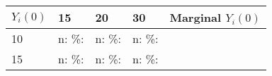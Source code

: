 \documentclass[]{article}
\begin{document}
\begin{longtable}[]{@{}lllll@{}}
\toprule
\begin{minipage}[b]{0.19\columnwidth}\raggedright\strut
\(Y_{i}(0)\)\strut
\end{minipage} & \begin{minipage}[b]{0.06\columnwidth}\raggedright\strut
15\strut
\end{minipage} & \begin{minipage}[b]{0.06\columnwidth}\raggedright\strut
20\strut
\end{minipage} & \begin{minipage}[b]{0.06\columnwidth}\raggedright\strut
30\strut
\end{minipage} & \begin{minipage}[b]{0.32\columnwidth}\raggedright\strut
Marginal \(Y_{i}(0)\)\strut
\end{minipage}\tabularnewline
\midrule
\endhead
\begin{minipage}[t]{0.19\columnwidth}\raggedright\strut
10\strut
\end{minipage} & \begin{minipage}[t]{0.06\columnwidth}\raggedright\strut
n: \%:\strut
\end{minipage} & \begin{minipage}[t]{0.06\columnwidth}\raggedright\strut
n: \%:\strut
\end{minipage} & \begin{minipage}[t]{0.06\columnwidth}\raggedright\strut
n: \%:\strut
\end{minipage} & \begin{minipage}[t]{0.32\columnwidth}\raggedright\strut
\strut
\end{minipage}\tabularnewline
\begin{minipage}[t]{0.19\columnwidth}\raggedright\strut
15\strut
\end{minipage} & \begin{minipage}[t]{0.06\columnwidth}\raggedright\strut
n: \%:\strut
\end{minipage} & \begin{minipage}[t]{0.06\columnwidth}\raggedright\strut
n: \%:\strut
\end{minipage} & \begin{minipage}[t]{0.06\columnwidth}\raggedright\strut
n: \%:\strut
\end{minipage} & \begin{minipage}[t]{0.32\columnwidth}\raggedright\strut
\strut
\end{minipage}\tabularnewline

\end{longtable}
\end{document}
